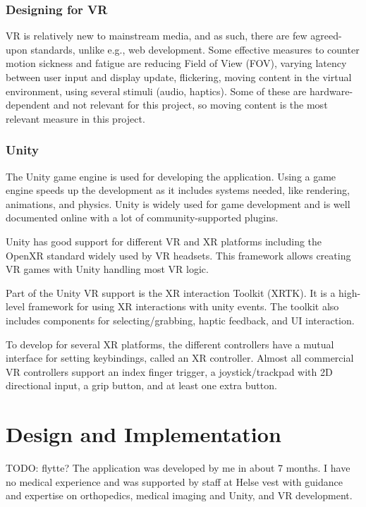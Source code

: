\documentclass[a4paper]{report}
\begin{document}
\subsection{Designing for VR}
VR is relatively new to mainstream media, and as such, there are few agreed-upon standards, unlike e.g., web development.
Some effective measures to counter motion sickness and fatigue are reducing Field of View (FOV), varying latency between user input and display update, flickering, moving content in the virtual environment, using several stimuli (audio, haptics)\cite{chang_virtual_2020}. Some of these are hardware-dependent and not relevant for this project, so moving content is the most relevant measure in this project.

\subsection{Unity}

The Unity game engine is used for developing the application\cite{unity}. Using a game engine speeds up the development as it includes systems needed, like rendering, animations, and physics. Unity is widely used for game development\cite{gameenginesonsteam} and is well documented online with a lot of community-supported plugins.

Unity has good support for different VR and XR platforms\cite{unityxr} including the OpenXR standard widely used by VR headsets\cite{openxr}. This framework allows creating VR games with Unity handling most VR logic.

Part of the Unity VR support is the XR interaction Toolkit (XRTK)\cite{xrinteractiontoolkit}. It is a high-level framework for using XR interactions with unity events. The toolkit also includes components for selecting/grabbing, haptic feedback, and UI interaction.

To develop for several XR platforms, the different controllers have a mutual interface for setting keybindings, called an XR controller. Almost all commercial VR controllers support an index finger trigger, a joystick/trackpad with 2D directional input, a grip button, and at least one extra button\cite{technologies_unity_nodate}.



\chapter{Design and Implementation}\label{Design and Implementation}
TODO: flytte?
The application was developed by me in about 7 months. I have no medical experience and was supported by staff at Helse vest with guidance and expertise on orthopedics, medical imaging and Unity, and VR development.
\end{document}
